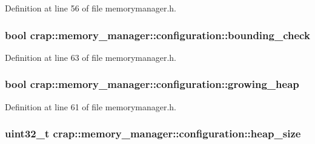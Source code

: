 Definition at line 56 of file memorymanager.\+h.

\hypertarget{structcrap_1_1memory__manager_1_1configuration_a08b165edae1810bab7f671cf90ee1c1a}{}
\subsubsection[{bounding\+\_\+check}]{\setlength{\rightskip}{0pt plus 5cm}bool crap\+::memory\+\_\+manager\+::configuration\+::bounding\+\_\+check}\label{structcrap_1_1memory__manager_1_1configuration_a08b165edae1810bab7f671cf90ee1c1a}


Definition at line 63 of file memorymanager.\+h.

\hypertarget{structcrap_1_1memory__manager_1_1configuration_a942e759edcd1129f4571691e87172f8f}{}
\subsubsection[{growing\+\_\+heap}]{\setlength{\rightskip}{0pt plus 5cm}bool crap\+::memory\+\_\+manager\+::configuration\+::growing\+\_\+heap}\label{structcrap_1_1memory__manager_1_1configuration_a942e759edcd1129f4571691e87172f8f}


Definition at line 61 of file memorymanager.\+h.

\hypertarget{structcrap_1_1memory__manager_1_1configuration_aa7b7dd302d12394b4933cd10c19b9bb3}{}
\subsubsection[{heap\+\_\+size}]{\setlength{\rightskip}{0pt plus 5cm}uint32\+\_\+t crap\+::memory\+\_\+manager\+::configuration\+::heap\+\_\+size}\label{structcrap_1_1memory__manager_1_1configuration_aa7b7dd302d12394b4933cd10c19b9bb3}


